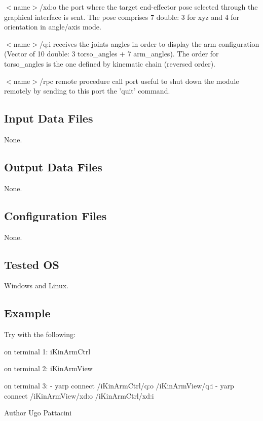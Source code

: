\begin{DoxyItemize}
\item {\itshape } $<$name$>$/xd\+:o the port where the target end-\/effector pose selected through the graphical interface is sent. The pose comprises 7 double\+: 3 for xyz and 4 for orientation in angle/axis mode.
\item {\itshape } $<$name$>$/q\+:i receives the joints angles in order to display the arm configuration (Vector of 10 double\+: 3 torso\+\_\+angles + 7 arm\+\_\+angles). The order for torso\+\_\+angles is the one defined by kinematic chain (reversed order).
\item {\itshape } $<$name$>$/rpc remote procedure call port useful to shut down the module remotely by sending to this port the 'quit' command.
\end{DoxyItemize}\hypertarget{group__icub__signalScope_in_files_sec}{}\subsection{Input Data Files}\label{group__icub__signalScope_in_files_sec}
None.\hypertarget{group__icub__signalScope_out_data_sec}{}\subsection{Output Data Files}\label{group__icub__signalScope_out_data_sec}
None.\hypertarget{group__icub__signalScope_conf_file_sec}{}\subsection{Configuration Files}\label{group__icub__signalScope_conf_file_sec}
None.\hypertarget{group__icub__tld_tested_os_sec}{}\subsection{Tested O\+S}\label{group__icub__tld_tested_os_sec}
Windows and Linux.\hypertarget{group__icub__signalScope_example_sec}{}\subsection{Example}\label{group__icub__signalScope_example_sec}
Try with the following\+:


\begin{DoxyCode}
on terminal 1: iKinArmCtrl 
 
on terminal 2: iKinArmView 
 
on terminal 3: 
- yarp connect /iKinArmCtrl/q:o  /iKinArmView/q:i 
- yarp connect /iKinArmView/xd:o /iKinArmCtrl/xd:i 
\end{DoxyCode}


\begin{DoxyAuthor}{Author}
Ugo Pattacini 
\end{DoxyAuthor}
